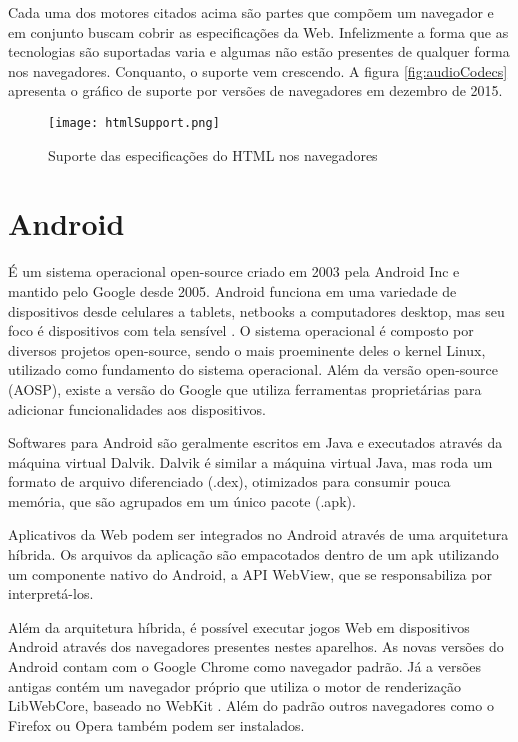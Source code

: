 Cada uma dos motores citados acima são partes que compõem um
navegador e em conjunto buscam cobrir as especificações da Web.
Infelizmente a forma que as tecnologias são suportadas varia e algumas
não estão presentes de qualquer forma nos navegadores. Conquanto,
o suporte vem crescendo. A figura \ref{fig:audioCodecs} apresenta o
gráfico de suporte por versões de navegadores em dezembro de 2015.

\begin{figure}[H]
    \centering
    \texttt{[image: htmlSupport.png]}
	\caption{Suporte das especificações do HTML nos navegadores}
    \label{fig:htmlSupport}
\end{figure}

\section{Android}

É um sistema operacional open-source criado em 2003 pela Android
Inc e mantido pelo Google desde 2005. Android funciona em uma
variedade de dispositivos desde celulares a tablets, netbooks a
computadores desktop, mas seu foco é dispositivos com tela sensível
\autocite{chromeVsAndroid}. O sistema operacional é composto por
diversos projetos open-source, sendo o mais proeminente deles o kernel
Linux, utilizado como fundamento do sistema operacional. Além
da versão open-source (AOSP), existe a versão do Google que utiliza
ferramentas proprietárias  para adicionar funcionalidades aos dispositivos.

Softwares para Android são geralmente escritos em Java e executados
através da máquina virtual Dalvik. Dalvik é similar a máquina
virtual Java, mas roda um formato de arquivo diferenciado (.dex),
otimizados para consumir pouca memória, que são agrupados em um único
pacote (.apk).

Aplicativos da Web podem ser integrados no Android através de uma
arquitetura híbrida. Os arquivos da aplicação são empacotados dentro
de um apk utilizando um componente nativo do Android, a API WebView, que
se responsabiliza por interpretá-los.

Além da arquitetura híbrida, é possível executar jogos Web em
dispositivos Android através dos navegadores presentes nestes
aparelhos. As novas versões do Android contam com o Google Chrome como navegador
padrão. Já a versões antigas contém um navegador próprio
que utiliza o motor de renderização LibWebCore, baseado no WebKit
\autocite{comparisonPlatforms}. Além do padrão outros navegadores como
o Firefox ou Opera também podem ser instalados.

